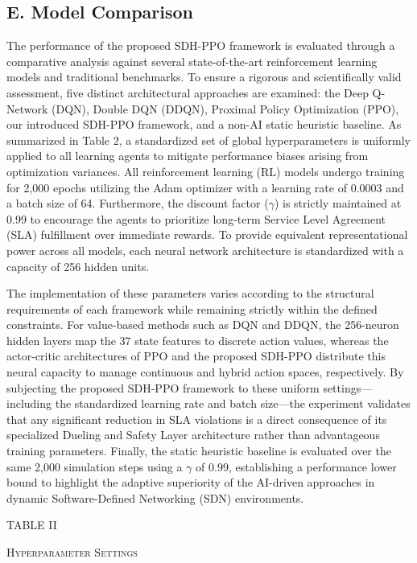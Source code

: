 \subsection{E. Model Comparison}\label{e.-model-comparison}

The performance of the proposed SDH-PPO framework is evaluated through a comparative analysis against several state-of-the-art reinforcement learning models and traditional benchmarks. To ensure a rigorous and scientifically valid assessment, five distinct architectural approaches are examined: the Deep Q-Network (DQN), Double DQN (DDQN), Proximal Policy Optimization (PPO), our introduced SDH-PPO framework, and a non-AI static heuristic baseline. As summarized in Table 2, a standardized set of global hyperparameters is uniformly applied to all learning agents to mitigate performance biases arising from optimization variances. All reinforcement learning (RL) models undergo training for 2,000 epochs utilizing the Adam optimizer with a learning rate of 0.0003 and a batch size of 64. Furthermore, the discount factor (\(\gamma\)) is strictly maintained at 0.99 to encourage the agents to prioritize long-term Service Level Agreement (SLA) fulfillment over immediate rewards. To provide equivalent representational power across all models, each neural network architecture is standardized with a capacity of 256 hidden units.

The implementation of these parameters varies according to the structural requirements of each framework while remaining strictly within the defined constraints. For value-based methods such as DQN and DDQN, the 256-neuron hidden layers map the 37 state features to discrete action values, whereas the actor-critic architectures of PPO and the proposed SDH-PPO distribute this neural capacity to manage continuous and hybrid action spaces, respectively. By subjecting the proposed SDH-PPO framework to these uniform settings---including the standardized learning rate and batch size---the experiment validates that any significant reduction in SLA violations is a direct consequence of its specialized Dueling and Safety Layer architecture rather than advantageous training parameters. Finally, the static heuristic baseline is evaluated over the same 2,000 simulation steps using a \(\gamma\) of 0.99, establishing a performance lower bound to highlight the adaptive superiority of the AI-driven approaches in dynamic Software-Defined Networking (SDN) environments.

TABLE II

\textsc{Hyperparameter Settings}

